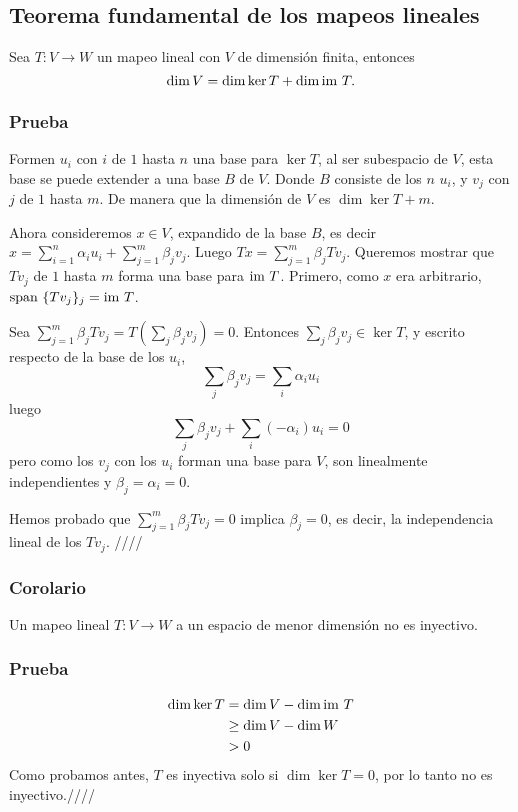 \documentclass{article}
\begin{document}
\subsection{Teorema fundamental de los mapeos lineales}
Sea $T: V\rightarrow W$ un mapeo lineal con $V$ de dimensión finita,
entonces
$$\dim V = \dim\ker T + \dim\text{im } T.$$

\subsubsection*{Prueba}
Formen $u_i$ con $i$ de $1$ hasta $n$ una base para $\ker T$,
al ser subespacio de $V$, esta base se puede extender a una base $B$
de $V$. Donde $B$ consiste de los $n$ $u_i$, y
$v_j$ con $j$ de $1$ hasta $m$. De manera que la dimensión de $V$
es $\dim\ker T+m$.

Ahora consideremos $x\in V$, expandido de la base $B$, es decir\\
$x= \sum^n_{i=1}\alpha_iu_i + \sum^m_{j=1}\beta_jv_j$. Luego
$Tx = \sum^m_{j=1}\beta_jTv_j$. Queremos mostrar que $Tv_j$ de
$1$ hasta $m$ forma una base para $\text{im } T$. Primero, como $x$ era arbitrario, $\text{span } \{Tv_j\}_j = \text{im } T$.

Sea $\sum^m_{j=1}\beta_jTv_j = T(\sum_j\beta_jv_j)=0$.
Entonces $\sum_j\beta_jv_j \in \ker T$, y escrito respecto de la base
de los $u_i$,
$$\sum_j\beta_jv_j = \sum_i\alpha_iu_i$$
luego
$$\sum_j\beta_jv_j + \sum_i(-\alpha_i)u_i = 0$$
pero como los $v_j$ con los $u_i$ forman una base para $V$,
son linealmente independientes y $\beta_j=\alpha_i=0$.

Hemos probado que $\sum^m_{j=1}\beta_jTv_j = 0$ implica
$\beta_j = 0$, es decir, la independencia lineal de los $Tv_j$.
\hfill ////

\subsubsection{Corolario}
Un mapeo lineal $T:V\rightarrow W$ a un espacio de menor dimensión no es inyectivo.
\subsubsection*{Prueba}
\begin{align*}
\dim\ker T &= \dim V - \dim\text{im } T\\
    &\geq \dim V - \dim W\\
    &> 0
\end{align*}
Como probamos antes, $T$ es inyectiva solo si $\dim \ker T = 0$,
por lo tanto no es inyectivo.\hfill ////
\end{document}
